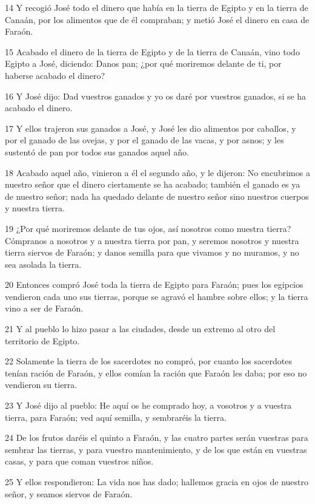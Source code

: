 \par 14 Y recogió José todo el dinero que había en la tierra de Egipto y en la tierra de Canaán, por los alimentos que de él compraban; y metió José el dinero en casa de Faraón.
\par 15 Acabado el dinero de la tierra de Egipto y de la tierra de Canaán, vino todo Egipto a José, diciendo: Danos pan; ¿por qué moriremos delante de ti, por haberse acabado el dinero?
\par 16 Y José dijo: Dad vuestros ganados y yo os daré por vuestros ganados, si se ha acabado el dinero.
\par 17 Y ellos trajeron sus ganados a José, y José les dio alimentos por caballos, y por el ganado de las ovejas, y por el ganado de las vacas, y por asnos; y les sustentó de pan por todos sus ganados aquel año.
\par 18 Acabado aquel año, vinieron a él el segundo año, y le dijeron: No encubrimos a nuestro señor que el dinero ciertamente se ha acabado; también el ganado es ya de nuestro señor; nada ha quedado delante de nuestro señor sino nuestros cuerpos y nuestra tierra.
\par 19 ¿Por qué moriremos delante de tus ojos, así nosotros como nuestra tierra? Cómpranos a nosotros y a nuestra tierra por pan, y seremos nosotros y nuestra tierra siervos de Faraón; y danos semilla para que vivamos y no muramos, y no sea asolada la tierra.
\par 20 Entonces compró José toda la tierra de Egipto para Faraón; pues los egipcios vendieron cada uno sus tierras, porque se agravó el hambre sobre ellos; y la tierra vino a ser de Faraón.
\par 21 Y al pueblo lo hizo pasar a las ciudades, desde un extremo al otro del territorio de Egipto.
\par 22 Solamente la tierra de los sacerdotes no compró, por cuanto los sacerdotes tenían ración de Faraón, y ellos comían la ración que Faraón les daba; por eso no vendieron su tierra.
\par 23 Y José dijo al pueblo: He aquí os he comprado hoy, a vosotros y a vuestra tierra, para Faraón; ved aquí semilla, y sembraréis la tierra.
\par 24 De los frutos daréis el quinto a Faraón, y las cuatro partes serán vuestras para sembrar las tierras, y para vuestro mantenimiento, y de los que están en vuestras casas, y para que coman vuestros niños.
\par 25 Y ellos respondieron: La vida nos has dado; hallemos gracia en ojos de nuestro señor, y seamos siervos de Faraón.
